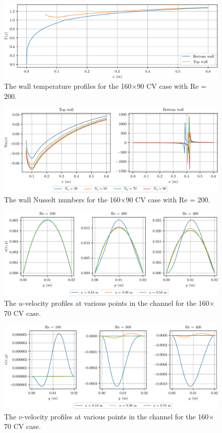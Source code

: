 \documentclass{article}
\begin{document}
\begin{figure}[H]
	\centering
	\includegraphics[width=0.9\linewidth]{../results/1b_Twall}
	\caption{The wall temperature profiles for the 160$\times$90 CV case with Re = 200.}
	\label{fig:1b_Twall}
\end{figure}

\begin{figure}[H]
	\centering
	\includegraphics[width=0.9\linewidth]{../results/1c_Nu}
	\caption{The wall Nusselt numbers for the 160$\times$90 CV case with Re = 200.}
	\label{fig:1c_Nu}
\end{figure}

\begin{figure}[H]
	\centering
	\includegraphics[width=0.9\linewidth]{../results/2_u}
	\caption{The $u$-velocity profiles at various points in the channel for the 160$\times$70 CV case.}
	\label{fig:2_u}
\end{figure}

\begin{figure}[H]
	\centering
	\includegraphics[width=0.9\linewidth]{../results/2_v}
	\caption{The $v$-velocity profiles at various points in the channel for the 160$\times$70 CV case.}
	\label{fig:2_v}
\end{figure}
\end{document}
